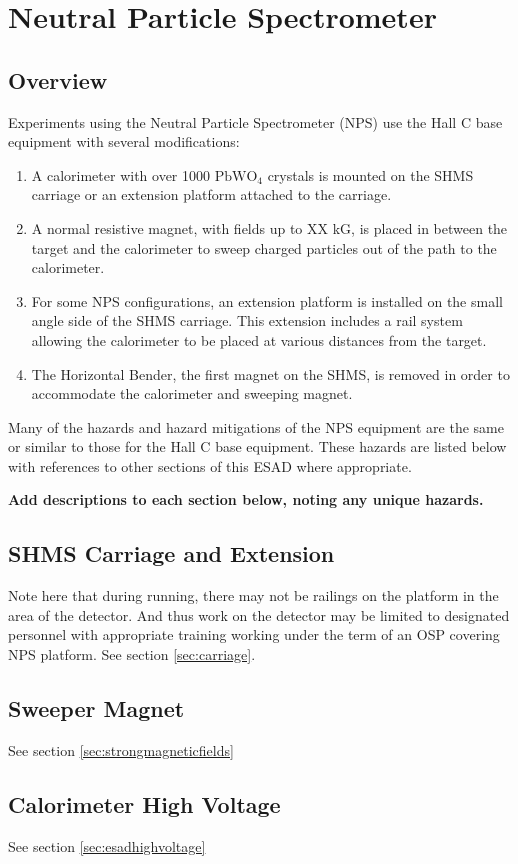 \chapter{Neutral Particle Spectrometer}
\section{Overview}
Experiments using the Neutral Particle Spectrometer (NPS) use the Hall C base
equipment with several modifications:
\begin{enumerate}
\item A calorimeter with over 1000 $\textrm{PbWO}_4$ crystals is mounted
  on the SHMS carriage or an extension platform attached to the
  carriage.
\item A normal resistive magnet, with fields up to XX kG, is placed in
  between the target and the calorimeter to sweep charged particles
  out of the path to the calorimeter.
\item For some NPS configurations, an extension platform is installed
  on the small angle side of the SHMS carriage.  This extension
  includes a rail system allowing the calorimeter to be placed at
  various distances from the target.
\item The Horizontal Bender, the first magnet on the SHMS, is removed
  in order to accommodate the calorimeter and sweeping magnet.
\end{enumerate}

Many of the hazards and hazard mitigations of the NPS equipment are
the same or similar to those for the Hall C base equipment.  These
hazards are listed below with references to other sections of this
ESAD where appropriate.

\textbf{Add descriptions to each section below, noting any unique hazards.}
\section{SHMS Carriage and Extension}
Note here that during running, there may not be railings on the
platform in the area of the detector.  And thus work on the detector
may be limited to designated personnel with appropriate training
working under the term of an OSP covering NPS platform.
See section \ref{sec:carriage}.
\section{Sweeper Magnet}
See section \ref{sec:strongmagneticfields}
\section{Calorimeter High Voltage}
See section \ref{sec:esadhighvoltage}



